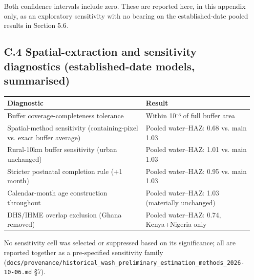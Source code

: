 Both confidence intervals include zero. These are reported here, in this appendix only, as an exploratory sensitivity with no bearing on the established-date pooled results in Section 5.6.

\subsection*{C.4 Spatial-extraction and sensitivity diagnostics (established-date models, summarised)}

\begingroup\fontsize{10}{15}\selectfont\setlength{\tabcolsep}{3pt}
\begin{longtable}{>{\raggedright\arraybackslash}p{8.56cm}>{\raggedright\arraybackslash}p{5.50cm}}
\toprule
Diagnostic & Result \\
\midrule
\endhead
Buffer coverage-completeness tolerance & Within 10⁻³ of full buffer area \\
Spatial-method sensitivity (containing-pixel vs. exact buffer average) & Pooled water--HAZ: 0.68 vs. main 1.03 \\
Rural-10km buffer sensitivity (urban unchanged) & Pooled water--HAZ: 1.01 vs. main 1.03 \\
Stricter postnatal completion rule (+1 month) & Pooled water--HAZ: 0.95 vs. main 1.03 \\
Calendar-month age construction throughout & Pooled water--HAZ: 1.03 (materially unchanged) \\
DHS/IHME overlap exclusion (Ghana removed) & Pooled water--HAZ: 0.74, Kenya+Nigeria only \\
\bottomrule
\end{longtable}
\endgroup

No sensitivity cell was selected or suppressed based on its significance; all are reported together as a pre-specified sensitivity family (\texttt{docs/\allowbreak{}provenance/\allowbreak{}historical\_\allowbreak{}wash\_\allowbreak{}preliminary\_\allowbreak{}estimation\_\allowbreak{}methods\_\allowbreak{}2026-\allowbreak{}10-\allowbreak{}06.\allowbreak{}md} §7).
